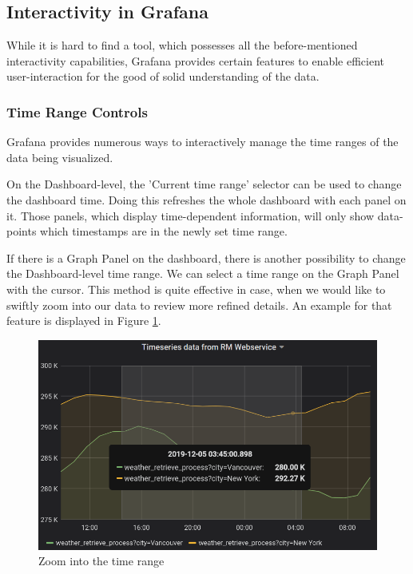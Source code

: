 \subsection{Interactivity in Grafana}

While it is hard to find a tool, which possesses all the before-mentioned interactivity capabilities, Grafana provides certain features to enable efficient user-interaction for the good of solid understanding of the data.


\subsubsection{Time Range Controls}

Grafana provides numerous ways to interactively manage the time ranges of the data being visualized.

On the Dashboard-level, the 'Current time range' selector can be used to change the dashboard time. Doing this refreshes the whole dashboard with each panel on it. Those panels, which display time-dependent information, will only show data-points which timestamps are in the newly set time range.

If there is a Graph Panel on the dashboard, there is another possibility to change the Dashboard-level time range. We can select a time range on the Graph Panel with the cursor. This method is quite effective in case, when we would like to swiftly zoom into our data to review more refined details. An example for that feature is displayed in Figure \ref{fig:select-time}.

\begin{figure}[h]
	\centering
	\includegraphics[width=130mm, keepaspectratio]{figures/select-time.png}
	\caption{Zoom into the time range}
	\label{fig:select-time}
\end{figure}

